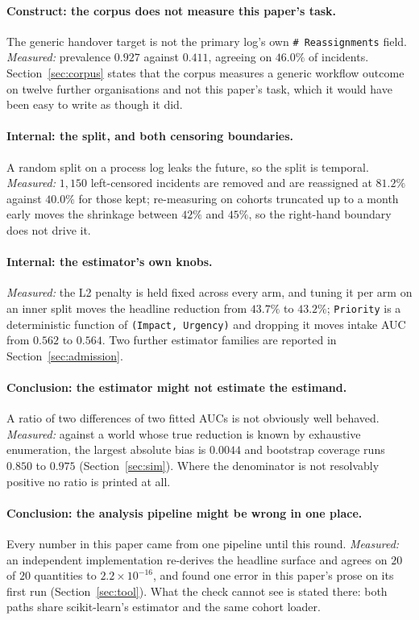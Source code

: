 \documentclass[preprint,12pt]{elsarticle}
\begin{document}
\paragraph{Construct: the corpus does not measure this paper's task.}
The generic handover target is not the primary log's own
\texttt{\# Reassignments} field. \emph{Measured:} prevalence $0.927$ against
$0.411$, agreeing on $46.0\%$ of incidents. Section~\ref{sec:corpus} states
that the corpus measures a generic workflow outcome on twelve further
organisations and not this paper's task, which it would have been easy to
write as though it did.

\paragraph{Internal: the split, and both censoring boundaries.}
A random split on a process log leaks the future, so the split is temporal.
\emph{Measured:} $1{,}150$ left-censored incidents are removed and are
reassigned at $81.2\%$ against $40.0\%$ for those kept; re-measuring on
cohorts truncated up to a month early moves the shrinkage between $42\%$ and
$45\%$, so the right-hand boundary does not drive it.

\paragraph{Internal: the estimator's own knobs.}
\emph{Measured:} the L2 penalty is held fixed across every arm, and tuning it
per arm on an inner split moves the headline reduction from $43.7\%$ to
$43.2\%$; \texttt{Priority} is a deterministic function of
\texttt{(Impact, Urgency)} and dropping it moves intake AUC from $0.562$ to
$0.564$. Two further estimator families are reported in
Section~\ref{sec:admission}.

\paragraph{Conclusion: the estimator might not estimate the estimand.}
A ratio of two differences of two fitted AUCs is not obviously well behaved.
\emph{Measured:} against a world whose true reduction is known by exhaustive
enumeration, the largest absolute bias is $0.0044$ and bootstrap coverage runs
$0.850$ to $0.975$ (Section~\ref{sec:sim}). Where the denominator is not
resolvably positive no ratio is printed at all.

\paragraph{Conclusion: the analysis pipeline might be wrong in one place.}
Every number in this paper came from one pipeline until this round.
\emph{Measured:} an independent implementation re-derives the headline surface
and agrees on $20$ of $20$ quantities to $2.2 \times 10^{-16}$, and found one
error in this paper's prose on its first run (Section~\ref{sec:tool}). What
the check cannot see is stated there: both paths share scikit-learn's
estimator and the same cohort loader.
\end{document}
